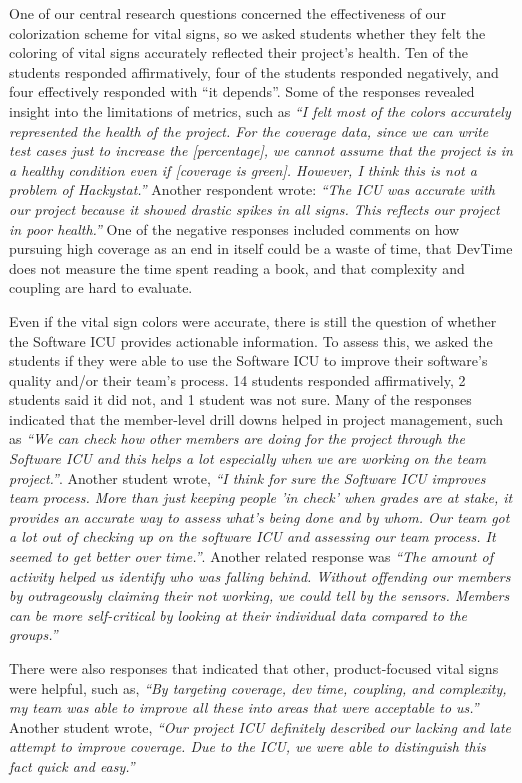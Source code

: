 \documentclass[10pt,twocolumn]{article}
\begin{document}
One of our central research questions concerned the effectiveness of our
colorization scheme for vital signs, so we asked students whether they felt
the coloring of vital signs accurately reflected their project's health.
Ten of the students responded affirmatively, four of the students responded
negatively, and four effectively responded with ``it depends''.  Some of
the responses revealed insight into the limitations of metrics, such as
{\em ``I felt most of the colors accurately represented the health of the
project. For the coverage data, since we can write test cases just to
increase the [percentage], we cannot assume that the project is in a
healthy condition even if [coverage is green]. However, I think this is not
a problem of Hackystat.''}  Another respondent wrote: {\em ``The ICU was
accurate with our project because it showed drastic spikes in all signs.
This reflects our project in poor health.''}  One of the negative responses
included comments on how pursuing high coverage as an end in itself could
be a waste of time, that DevTime does not measure the time spent reading a
book, and that complexity and coupling are hard to evaluate.

Even if the vital sign colors were accurate, there is still the question of
whether the Software ICU provides actionable information. To assess this,
we asked the students if they were able to use the Software ICU to improve
their software's quality and/or their team's process.  14 students
responded affirmatively, 2 students said it did not, and 1 student was not
sure.  Many of the responses indicated that the member-level drill downs
helped in project management, such as {\em ``We can check how other members
are doing for the project through the Software ICU and this helps a lot
especially when we are working on the team project.''}.  Another student
wrote, {\em ``I think for sure the Software ICU improves team process. More
than just keeping people 'in check' when grades are at stake, it
provides an accurate way to assess what's being done and by whom. Our team
got a lot out of checking up on the software ICU and assessing our team
process. It seemed to get better over time.''}.  Another related response
was {\em ``The amount of activity helped us identify who was falling
behind. Without offending our members by outrageously claiming their not
working, we could tell by the sensors. Members can be more self-critical by
looking at their individual data compared to the groups.''}

There were also responses that indicated that other, product-focused vital
signs were helpful, such as, {\em ``By targeting coverage, dev time,
coupling, and complexity, my team was able to improve all these into areas
that were acceptable to us.''}  Another student wrote, {\em ``Our project
ICU definitely described our lacking and late attempt to improve
coverage. Due to the ICU, we were able to distinguish this fact quick and
easy.''}
\end{document}
